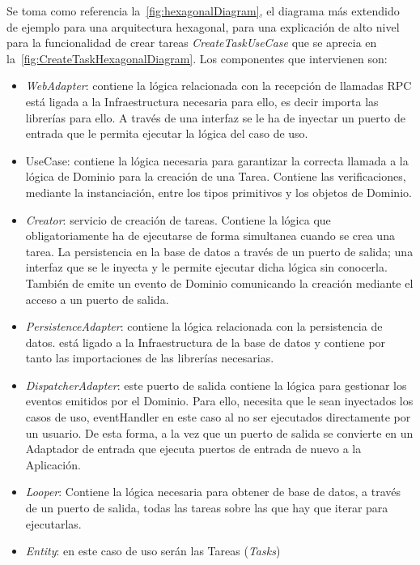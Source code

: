 
Se toma como referencia la~\cref{fig:hexagonalDiagram}, el diagrama más extendido de ejemplo para una arquitectura hexagonal, para una explicación de alto nivel para la funcionalidad de crear tareas \textit{CreateTaskUseCase} que se aprecia en la~\cref{fig:CreateTaskHexagonalDiagram}.
Los componentes que intervienen son:
\begin{itemize}
    \item \textit{WebAdapter}: contiene la lógica relacionada con la recepción de llamadas RPC está ligada a la Infraestructura necesaria para ello, es decir importa las librerías para ello.
    A través de una interfaz se le ha de inyectar un puerto de entrada que le permita ejecutar la lógica del caso de uso.
    \item UseCase: contiene la lógica necesaria para garantizar la correcta llamada a la lógica de Dominio para la creación de una Tarea.
    Contiene las verificaciones, mediante la instanciación, entre los tipos primitivos y los objetos de Dominio.
    \item \textit{Creator}: servicio de creación de tareas.
    Contiene la lógica que obligatoriamente ha de ejecutarse de forma simultanea cuando se crea una tarea.
    La persistencia en la base de datos a través de un puerto de salida; una interfaz que se le inyecta y le permite ejecutar dicha lógica sin conocerla.
    También de emite un evento de Dominio comunicando la creación mediante el acceso a un puerto de salida.
    \item \textit{PersistenceAdapter}: contiene la lógica relacionada con la persistencia de datos.
    está ligado a la Infraestructura de la base de datos y contiene por tanto las importaciones de las librerías necesarias.
    \item \textit{DispatcherAdapter}: este puerto de salida contiene la lógica para gestionar los eventos emitidos por el Dominio.
    Para ello, necesita que le sean inyectados los casos de uso, eventHandler en este caso al no ser ejecutados directamente por un usuario.
    De esta forma, a la vez que un puerto de salida se convierte en un Adaptador de entrada que ejecuta puertos de entrada de nuevo a la Aplicación.
    \item \textit{Looper}: Contiene la lógica necesaria para obtener de base de datos, a través de un puerto de salida, todas las tareas sobre las que hay que iterar para ejecutarlas.
    \item \textit{Entity}: en este caso de uso serán las Tareas (\textit{Tasks})
\end{itemize}

